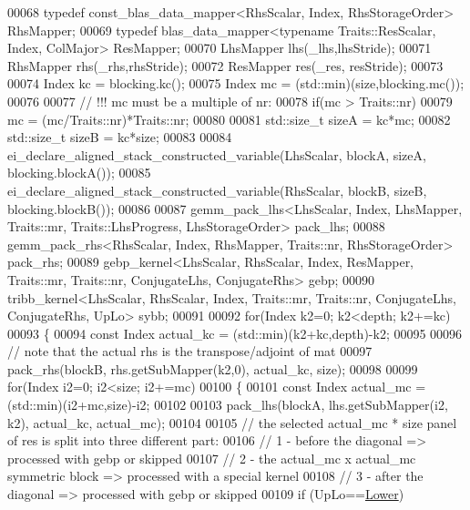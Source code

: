 \begin{DoxyCode}
00068     \textcolor{keyword}{typedef} const\_blas\_data\_mapper<RhsScalar, Index, RhsStorageOrder> RhsMapper;
00069     \textcolor{keyword}{typedef} blas\_data\_mapper<typename Traits::ResScalar, Index, ColMajor> ResMapper;
00070     LhsMapper lhs(\_lhs,lhsStride);
00071     RhsMapper rhs(\_rhs,rhsStride);
00072     ResMapper res(\_res, resStride);
00073 
00074     Index kc = blocking.kc();
00075     Index mc = (std::min)(size,blocking.mc());
00076 
00077     \textcolor{comment}{// !!! mc must be a multiple of nr:}
00078     \textcolor{keywordflow}{if}(mc > Traits::nr)
00079       mc = (mc/Traits::nr)*Traits::nr;
00080 
00081     std::size\_t sizeA = kc*mc;
00082     std::size\_t sizeB = kc*size;
00083 
00084     ei\_declare\_aligned\_stack\_constructed\_variable(LhsScalar, blockA, sizeA, blocking.blockA());
00085     ei\_declare\_aligned\_stack\_constructed\_variable(RhsScalar, blockB, sizeB, blocking.blockB());
00086 
00087     gemm\_pack\_lhs<LhsScalar, Index, LhsMapper, Traits::mr, Traits::LhsProgress, LhsStorageOrder> pack\_lhs;
00088     gemm\_pack\_rhs<RhsScalar, Index, RhsMapper, Traits::nr, RhsStorageOrder> pack\_rhs;
00089     gebp\_kernel<LhsScalar, RhsScalar, Index, ResMapper, Traits::mr, Traits::nr, ConjugateLhs, ConjugateRhs>
       gebp;
00090     tribb\_kernel<LhsScalar, RhsScalar, Index, Traits::mr, Traits::nr, ConjugateLhs, ConjugateRhs, UpLo> 
      sybb;
00091 
00092     \textcolor{keywordflow}{for}(Index k2=0; k2<depth; k2+=kc)
00093     \{
00094       \textcolor{keyword}{const} Index actual\_kc = (std::min)(k2+kc,depth)-k2;
00095 
00096       \textcolor{comment}{// note that the actual rhs is the transpose/adjoint of mat}
00097       pack\_rhs(blockB, rhs.getSubMapper(k2,0), actual\_kc, size);
00098 
00099       \textcolor{keywordflow}{for}(Index i2=0; i2<size; i2+=mc)
00100       \{
00101         \textcolor{keyword}{const} Index actual\_mc = (std::min)(i2+mc,size)-i2;
00102 
00103         pack\_lhs(blockA, lhs.getSubMapper(i2, k2), actual\_kc, actual\_mc);
00104 
00105         \textcolor{comment}{// the selected actual\_mc * size panel of res is split into three different part:}
00106         \textcolor{comment}{//  1 - before the diagonal => processed with gebp or skipped}
00107         \textcolor{comment}{//  2 - the actual\_mc x actual\_mc symmetric block => processed with a special kernel}
00108         \textcolor{comment}{//  3 - after the diagonal => processed with gebp or skipped}
00109         \textcolor{keywordflow}{if} (UpLo==\hyperlink{group__enums_gga39e3366ff5554d731e7dc8bb642f83cda891792b8ed394f7607ab16dd716f60e6}{Lower})

\end{DoxyCode}
